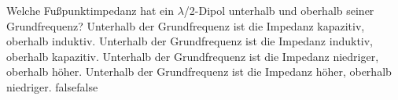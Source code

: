     {Welche Fußpunktimpedanz hat ein $\lambda$/2-Dipol unterhalb und oberhalb seiner Grundfrequenz?}
    {Unterhalb der Grundfrequenz ist die Impedanz kapazitiv, oberhalb induktiv.}
    {Unterhalb der Grundfrequenz ist die Impedanz induktiv, oberhalb kapazitiv.}
    {Unterhalb der Grundfrequenz ist die Impedanz niedriger, oberhalb höher.}
    {Unterhalb der Grundfrequenz ist die Impedanz höher, oberhalb niedriger.}
    {false}{false}